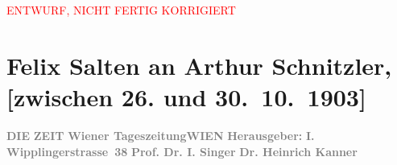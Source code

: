 
\begin{center}
            \textcolor{red}{ENTWURF, NICHT FERTIG KORRIGIERT}
                      \end{center}
            
         
         \renewcommand{\erwaehntePersonen}{Personen: Heinrich Kanner, Ernst Raupach, Isidor Singer}
         \renewcommand{\erwaehnteInstitutionen}{Institutionen: Die Zeit, Raimund-Theater}
         \renewcommand{\erwaehnteOrte}{Orte: Wien, Wipplingerstraße}
         \renewcommand{\erwaehnteWerke}{Werke: Der Müller und sein Kind. Volksdrama in fünf Aufzügen}
               \section[Felix Salten an Arthur Schnitzler, {[}zwischen 26. und 30. 10. 1903{]}]{ Felix Salten an Arthur Schnitzler, {[}zwischen 26. und
               30. 10. 1903{]}}\nopagebreak{}\rehead{ }\begin{ledgroupsized}[t]{13cm}\normalsize\beginnumbering \toendnotes[C]{\smallbreak\pagebreak[2]} 
\toendnotes[C]{\smallbreak}\pstart
           \noindent{}{\pb}\textcolor{gray}{\textbf{DIE}}\pend
           \pstart
           \textcolor{gray}{\textbf{ZEIT}}\pend
           \pstart
           \textcolor{gray}{\textbf{Wiener Tageszeitung}}\hfill \textcolor{gray}{\textbf{WIEN}}\pend
           \pstart
           \textcolor{gray}{\textbf{Herausgeber: }}\hfill \textcolor{gray}{\textbf{I. Wipplingerstrasse 38}}\pend
           \pstart
           \textcolor{gray}{\textbf{Prof. Dr. I. Singer}}\pend
           \pstart
           \textcolor{gray}{\textbf{Dr. Heinrich Kanner}}\pend
           \pstart

\end{ledgroupsized}
